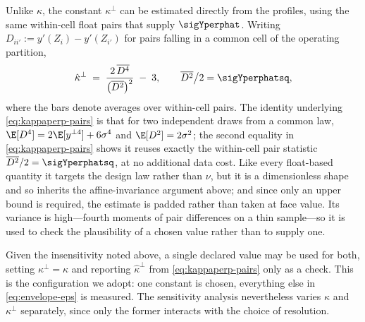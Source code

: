 \begin{remark}
Unlike $\kappa$, the constant $\kappa^{\perp}$ can be estimated directly
from the profiles, using the same within-cell float pairs that supply
$\sigYperphat$. Writing $D_{ii'}:=y'(Z_i)-y'(Z_{i'})$ for pairs falling
in a common cell of the operating partition,
\begin{equation}
  \hat\kappa^{\perp}
  \;=\;\frac{2\,\overline{D^4}}{\big(\overline{D^2}\big)^{2}}\;-\;3,
  \qquad
  \overline{D^{2}}\big/2=\sigYperphatsq ,
  \label{eq:kappaperp-pairs}
\end{equation}
where the bars denote averages over within-cell pairs. The identity
underlying \eqref{eq:kappaperp-pairs} is that for two independent draws
from a common law, $\E[D^4]=2\E[y^{\perp4}]+6\sigma^4$ and
$\E[D^2]=2\sigma^2$; the second equality in \eqref{eq:kappaperp-pairs}
shows it reuses exactly the within-cell pair statistic
$\overline{D^2}/2=\sigYperphatsq$, at no additional data cost. Like every float-based quantity it targets the
design law rather than $\nu$, but it is a dimensionless shape and so
inherits the affine-invariance argument above; and since only an upper
bound is required, the estimate is padded rather than taken at face
value. Its variance is high---fourth moments of pair differences on a
thin sample---so it is used to check the plausibility of a chosen value
rather than to supply one.

Given the insensitivity noted above, a single declared value may be used
for both, setting $\kappa^{\perp}=\kappa$ and reporting
$\hat\kappa^{\perp}$ from \eqref{eq:kappaperp-pairs} only as a check.
This is the configuration we adopt: one constant is chosen, everything
else in \eqref{eq:envelope-eps} is measured. The sensitivity analysis
nevertheless varies $\kappa$ and $\kappa^{\perp}$ separately, since only
the former interacts with the choice of resolution.
\end{remark}

